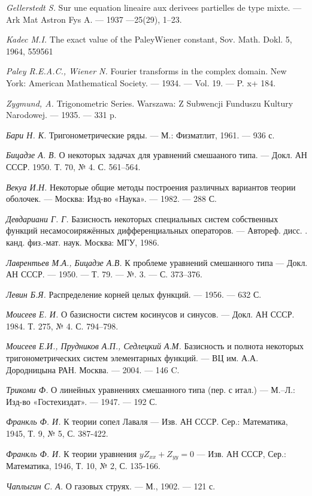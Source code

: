 ﻿\documentclass[oneside, final, 14pt]{extreport}
\begin{document}
\begin{thebibliography}{30}
	
	{\it Gellerstedt S.} Sur une equation lineaire aux derivees partielles de type mixte. — 
	Ark Mat Astron Fys A. — 1937 —25(29), 1–23. 

	{\it Kadec M.I.} The exact value of the PaleyWiener constant, 
	Sov. Math. Dokl. 5, 1964, 559561

	{\it Paley R.E.A.C., Wiener N.} Fourier transforms in the complex domain. 
	New York: American Mathematical Society. — 1934. — Vol. 19. — P. x+ 184.
	
	{\it Zygmund, A.} Trigonometric Series. 
		Warszawa: Z Subwencji Funduszu Kultury Narodowej. — 1935. — 331 p.
	
	{\it Бари Н. К.} Тригонометрические ряды. —
	М.: Физматлит, 1961. — 936 с.
	
	{\it Бицадзе А. В. } О некоторых задачах для уравнений смешааного типа. —
	Докл. АН СССР. 1950. Т. 70, № 4. С. 561–564.
	
	{\it Векуа И.Н.} Некоторые общие методы построения различных вариантов теории оболочек. — 
	Москва: Изд-во «Наука». — 1982. — 288 С.
	
	{\it Девдариани Г. Г.} Базисность некоторых специальных систем собственных функций несамосоиряжённых дифференциальных операторов. —
	Автореф. дисс. . канд. физ.-мат. наук. Москва: МГУ, 1986.
	
	{\it Лаврентьев М.А., Бицадзе А.В.} К проблеме уравнений смешанного типа — 
	Докл. АН СССР. — 1950. — Т. 79. — №. 3. — С. 373–376.

	{\it Левин Б.Я.} Распределение корней целых функций. — 1956. — 632 С.
	
	{\it Моисеев Е. И.} О базисности систем косинусов и синусов. —
	Докл. АН СССР. 1984. Т. 275, № 4. С. 794–798.
	
	{\it Моисеев Е.И., Прудников А.П., Седлецкий А.М.} Базисность и полнота некоторых тригонометрических систем элементарных функций. —
	ВЦ им. А.А. Дородницына РАН. Москва. — 2004. — 146 C.
	
	{\it Трикоми Ф.} О линейных уравнениях смешанного типа (пер. с итал.) —
	М.–Л.: Изд-во «Гостехиздат». — 1947. — 192 С.
	
	{\it Франкль Ф. И.} К теории сопел Лаваля —
	Изв. АН СССР. Сер.: Математика, 1945, Т. 9, № 5, С. 387-422.
	
	{\it Франкль Ф. И.} К теории уравнения $yZ_{xx} + Z_{yy} = 0$ —
	Изв. АН СССР, Сер.: Математика, 1946, Т. 10, № 2, С. 135-166.
	
	{\it Чаплыгин С. А.}  О газовых струях. — М., 1902. — 121 с.
	
\end{thebibliography}
\end{document}
